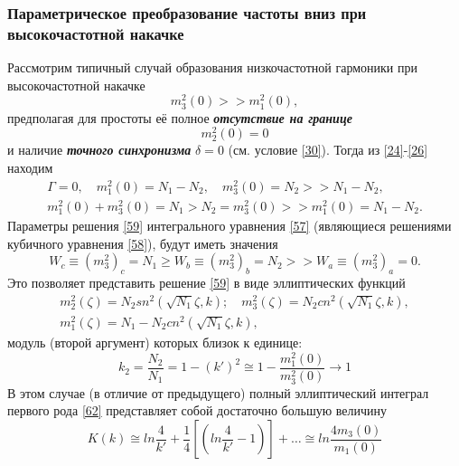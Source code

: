 \documentclass[a4paper]{article}
\begin{document}
	\subsubsection{Параметрическое преобразование частоты вниз при высокочастотной накачке}
	Рассмотрим типичный случай образования низкочастотной гармоники при высокочастотной накачке 
	\begin{equation}
		m_{3}^{2}(0)>>m_{1}^{2}(0),
		\label{67}
	\end{equation}
	предполагая для простоты её полное \textit{\textbf{отсутствие на границе}} 
	\begin{equation}
		m_{2}^{2}(0)=0
		\label{68}
	\end{equation}
	и наличие \textit{\textbf{точного синхронизма}} $\delta=0$ (см. условие \eqref{30}). Тогда из \eqref{24}-\eqref{26} находим
	\begin{equation}
		\begin{aligned}
			\Gamma=0,\quad m_{1}^{2}(0)=N_{1}-N_{2},\quad m_{3}^{2}(0)=N_{2}>>N_{1}-N_{2},\\
			m_{1}^{2}(0)+m_{3}^{2}(0)=N_{1}>N_{2}=m_{3}^{2}(0)>>m_{1}^{2}(0)=N_{1}-N_{2}.
		\end{aligned}\label{69}
	\end{equation}
	Параметры решения \eqref{59} интегрального уравнения \eqref{57} (являющиеся решениями кубичного уравнения \eqref{58}), будут иметь значения 
	\begin{equation}
		W_{c}\equiv(m_{3}^{2})_{c}=N_{1}\geq W_{b}\equiv(m_{3}^{2})_{b}=N_{2}>>W_ {a}\equiv(m_{3}^{2})_{a}=0.
		\label{70}
	\end{equation}
	Это позволяет представить решение \eqref{59} в виде эллиптических функций 
	\begin{equation}
		\begin{aligned}
			m_{2}^{2}(\zeta)=N_{2}sn^{2}(\sqrt{N_{1}}\zeta,k);\quad m_{3}^{2}(\zeta)=N_{2}cn^{2}(\sqrt{N_{1}}\zeta,k),\\
			m_{1}^{2}(\zeta)=N_{1}-N_{2}cn^{2}(\sqrt{N_{1}}\zeta,k),
		\end{aligned}\label{71}
	\end{equation}
	модуль (второй аргумент) которых близок к единице: 
	$$k_{2}=\frac{N_{2}}{N_{1}}=1-(k')^{2}\cong1-\frac{m_{1}^{2}(0)}{m_{3}^{2}(0)}\rightarrow1$$
	В этом случае (в отличие от предыдущего) полный эллиптический интеграл первого рода \eqref{62} представляет собой достаточно большую величину 
	$$K(k)\cong ln\frac{4}{k'}+\frac{1}{4}\left[\left(ln\frac{4}{k'}-1\right)\right]+\dots\cong ln\frac{4m_{3}(0)}{m_{1}(0)}$$
\end{document}
